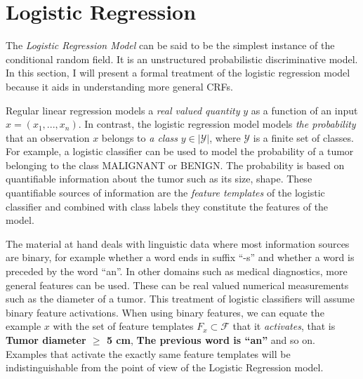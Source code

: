 \section{Logistic Regression}

The {\it Logistic Regression Model} can be said to be the simplest
instance of the conditional random field. It is an unstructured
probabilistic discriminative model. In this section, I will present a
formal treatment of the logistic regression model because it aids in
understanding more general CRFs.

Regular linear regression models a {\it real valued quantity} $y$ as a
function of an input $x = (x_1, ..., x_n)$. In contrast, the logistic
regression model models {\it the probability} that an observation $x$
belongs to {\it a class} $y \in |\mathcal{Y}|$, where $\mathcal{Y}$ is
a finite set of classes. For example, a logistic classifier can be
used to model the probability of a tumor belonging to the class {\sc
  MALIGNANT} or BENIGN. The probability is based on quantifiable
information about the tumor such as its size, shape. These quantifiable
sources of information are the {\it feature templates} of the logistic
classifier and combined with class labels they constitute the features of
the
model. %

The material at hand deals with linguistic data where most information
sources are binary, for example whether a word ends in suffix ``-s''
and whether a word is preceded by the word ``an''. In other domains
such as medical diagnostics, more general features can be used. These
can be real valued numerical measurements such as the diameter of a
tumor. This treatment of logistic classifiers will assume binary
feature activations. When using binary features, we can equate the example $x$
with the set of feature templates $F_x \subset \mathcal{F}$ that it {\it
  activates}, that is {\bf Tumor diameter $\geq$ 5 cm}, {\bf The previous word is ``an''} and so on. Examples that activate the exactly same
feature templates will be indistinguishable from the point of view of the
Logistic Regression model.

